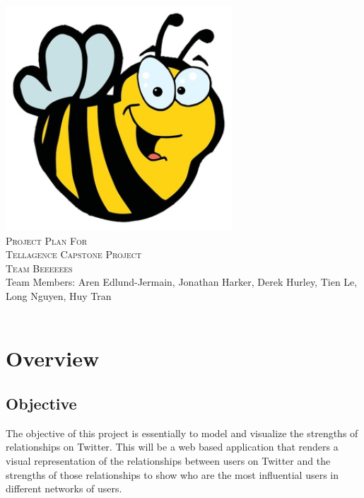\documentclass[12pt, letterpaper]{article}
\begin{document}
\begin{titlepage}

\begin{center}
\includegraphics[width=.5\textwidth]{./bee}\\[2cm]
\textsc{\LARGE Project Plan For}\\[1.5cm]
\textsc{\LARGE Tellagence Capstone Project}\\[1.5cm]
\textsc{\LARGE Team Beeeeees}\\[1.5cm]
\large Team Members: Aren Edlund-Jermain, Jonathan Harker, Derek Hurley, Tien Le, Long Nguyen, Huy Tran\\
\hfill \\
\end{center}

\vfill

\end{titlepage}

\tableofcontents
\pagebreak 

\section{Overview}
	\subsection{Objective}
	The objective of this project is essentially to model and visualize the strengths of relationships on Twitter. This will be a web based application that renders a visual representation of the relationships between users on Twitter and the strengths of those relationships to show who are the most influential users in different networks of users.
\end{document}
